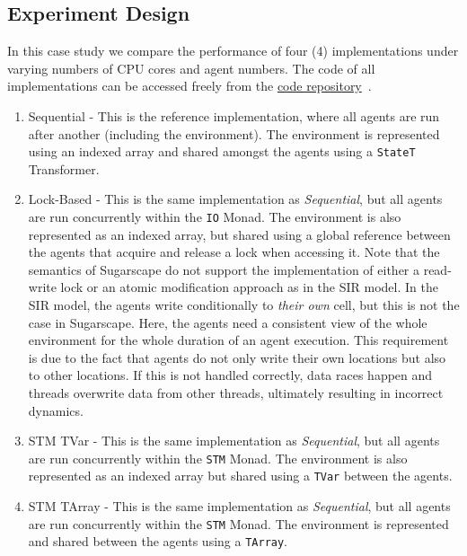 \subsection{Experiment Design}
In this case study we compare the performance of four (4) implementations under varying numbers of CPU cores and agent numbers. The code of all implementations can be accessed freely from the \href{https://github.com/thalerjonathan/haskell-stm-sugarscape}{code repository}~\cite{thaler_stm_sugarscape_repository}.

\begin{enumerate}
	\item Sequential - This is the reference implementation, where all agents are run after another (including the environment). The environment is represented using an indexed array \cite{array_hackage} and shared amongst the agents using a \texttt{StateT} Transformer.
	
	\item Lock-Based - This is the same implementation as \textit{Sequential}, but all agents are run concurrently within the \texttt{IO} Monad. The environment is also represented as an indexed array, but shared using a global reference between the agents that acquire and release a lock when accessing it. Note that the semantics of Sugarscape do not support the implementation of either a read-write lock or an atomic modification approach as in the SIR model. In the SIR model, the agents write conditionally to \textit{their own} cell, but this is not the case in Sugarscape. Here, the agents need a consistent view of the whole environment for the whole duration of an agent execution. This requirement is due to the fact that agents do not only write their own locations but also to other locations. If this is not handled correctly, data races happen and threads overwrite data from other threads, ultimately resulting in incorrect dynamics.
	
	\item STM TVar - This is the same implementation as \textit{Sequential}, but all agents are run concurrently within the \texttt{STM} Monad. The environment is also represented as an indexed array but shared using a \texttt{TVar} between the agents.
	
	\item STM TArray - This is the same implementation as \textit{Sequential}, but all agents are run concurrently within the \texttt{STM} Monad. The environment is represented and shared between the agents using a \texttt{TArray}. 
\end{enumerate}

